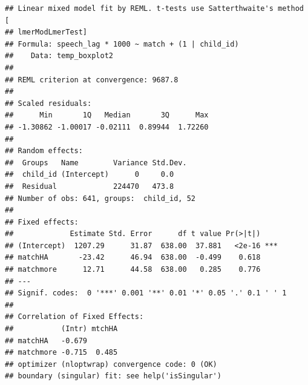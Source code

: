 \documentclass[
]{article}
\newenvironment{Shaded}{\begin{snugshade}}{\end{snugshade}}
\newcommand{\AttributeTok}[1]{\textcolor[rgb]{0.77,0.63,0.00}{#1}}
\newcommand{\CommentTok}[1]{\textcolor[rgb]{0.56,0.35,0.01}{\textit{#1}}}
\newcommand{\ConstantTok}[1]{\textcolor[rgb]{0.00,0.00,0.00}{#1}}
\newcommand{\ControlFlowTok}[1]{\textcolor[rgb]{0.13,0.29,0.53}{\textbf{#1}}}
\newcommand{\FunctionTok}[1]{\textcolor[rgb]{0.00,0.00,0.00}{#1}}
\newcommand{\NormalTok}[1]{#1}
\newcommand{\OtherTok}[1]{\textcolor[rgb]{0.56,0.35,0.01}{#1}}
\newcommand{\SpecialCharTok}[1]{\textcolor[rgb]{0.00,0.00,0.00}{#1}}
\newcommand{\StringTok}[1]{\textcolor[rgb]{0.31,0.60,0.02}{#1}}
\begin{document}
\begin{verbatim}
## Linear mixed model fit by REML. t-tests use Satterthwaite's method [
## lmerModLmerTest]
## Formula: speech_lag * 1000 ~ match + (1 | child_id)
##    Data: temp_boxplot2
## 
## REML criterion at convergence: 9687.8
## 
## Scaled residuals: 
##      Min       1Q   Median       3Q      Max 
## -1.30862 -1.00017 -0.02111  0.89944  1.72260 
## 
## Random effects:
##  Groups   Name        Variance Std.Dev.
##  child_id (Intercept)      0     0.0   
##  Residual             224470   473.8   
## Number of obs: 641, groups:  child_id, 52
## 
## Fixed effects:
##             Estimate Std. Error      df t value Pr(>|t|)    
## (Intercept)  1207.29      31.87  638.00  37.881   <2e-16 ***
## matchHA       -23.42      46.94  638.00  -0.499    0.618    
## matchmore      12.71      44.58  638.00   0.285    0.776    
## ---
## Signif. codes:  0 '***' 0.001 '**' 0.01 '*' 0.05 '.' 0.1 ' ' 1
## 
## Correlation of Fixed Effects:
##           (Intr) mtchHA
## matchHA   -0.679       
## matchmore -0.715  0.485
## optimizer (nloptwrap) convergence code: 0 (OK)
## boundary (singular) fit: see help('isSingular')
\end{verbatim}

\begin{Shaded}
\end{Shaded}
\end{document}
